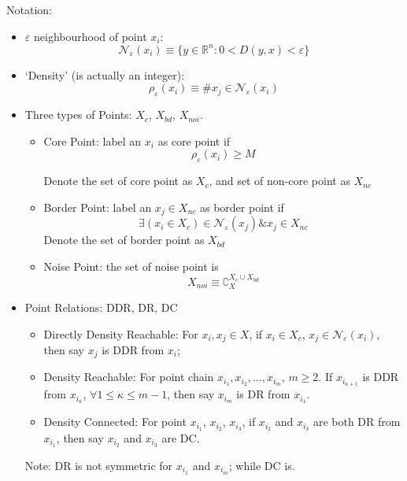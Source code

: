     Notation:
    \begin{itemize}[topsep=2pt,itemsep=2pt]
        \item $ \varepsilon  $ neighbourhood of point $ x_i $:
        \begin{equation}
             \mathcal{N}_\varepsilon (x_i)\equiv \{y\in \mathbb{R} ^n: 0<D(y,x)<\varepsilon \}
        \end{equation}
        \item `Density' (is actually an integer):
        \begin{equation}
            \rho _\varepsilon (x_i)\equiv \#  x_j\in \mathcal{N}_\varepsilon (x_i) 
        \end{equation}
        \item Three types of Points: $ X_c $, $ X_{bd} $, $ X_{noi} $.
        \begin{itemize}[topsep=2pt,itemsep=2pt]
            \item Core Point: label an $ x_i $ as core point if
        \begin{equation}
            \rho _\varepsilon (x_i)\geq M
        \end{equation}

        Denote the set of core point as $ X_c $, and set of non-core point as $ X_{nc} $
        
        \item Border Point: label an $ x_j\in X_{nc} $ as border point if
        \begin{equation}
             \exists (x_i\in X_c)\in \mathcal{N}_\varepsilon (x_j) \& x_j\in X_{nc}
        \end{equation}
        Denote the set of border point as $ X_{bd} $
        \item Noise Point: the set of noise point is 
        \begin{equation}X_{noi}\equiv\displaystyle{\complement_X^{X_{c}\cup X_{bd}} }\end{equation}
        \end{itemize}
    \item Point Relations: DDR, DR, DC
    \begin{itemize}[topsep=2pt,itemsep=2pt]
    \item Directly Density Reachable: For $ x_i,x_j\in X $, if $ x_i\in X_c $, $ x_j\in\mathcal{N}_\varepsilon (x_i) $, then say $ x_j $ is DDR from $ x_i $;
    \item Density Reachable: For point chain $ x_{i_1},x_{i_2},\ldots,x_{i_m} $, $ m\geq 2 $. If $ x_{i_{\kappa+1} } $ is DDR from $ x_{i_\kappa } $, $ \forall 1\leq \kappa \leq m-1 $, then say $ x_{i_m} $ is DR from $ x_{i_1} $.
    \item Density Connected: For point $ x_{i_1} $, $ x_{i_2} $, $ x_{i_3} $, if $ x_{i_2} $ and $ x_{i_3} $ are both DR from $ x_{i_1} $, then say $ x_{i_2} $ and $ x_{i_3} $ are DC. 
    \end{itemize}
    
    Note: DR is not symmetric for $ x_{i_1} $ and $ x_{i_m} $; while DC is.       
    \end{itemize}
    

